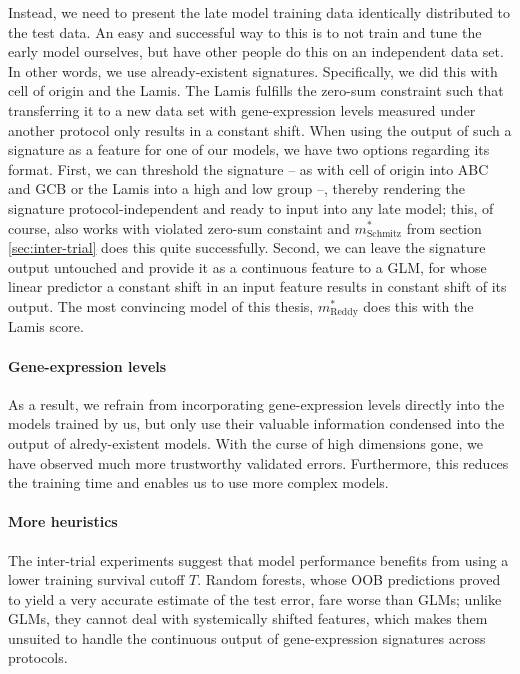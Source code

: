 Instead, we need to present the late model training data identically distributed to the test 
data. An easy and successful way to this is to not train and tune the early model ourselves, but have 
other people do this on an independent data set. In other words, we use already-existent signatures. 
Specifically, we did this with cell of origin and the Lamis. The Lamis fulfills the 
zero-sum constraint such that transferring it to a new data set with gene-expression levels 
measured under another protocol only results in a constant shift. When using the output of such 
a signature as a feature for one of our models, we have two options regarding its format.
First, we can threshold the signature -- as with cell of origin into ABC and GCB or the Lamis into 
a high and low group --, thereby rendering the signature protocol-independent and ready to input 
into any late model; this, of course, also works with violated zero-sum constaint and 
$m^*_\text{Schmitz}$ from section \ref{sec:inter-trial} 
does this quite successfully. Second, we can leave the signature output untouched and provide it as a 
continuous feature to a GLM, for whose linear predictor a constant shift in an input feature results 
in constant shift of its output. The most convincing model of this thesis, $m^*_\text{Reddy}$ does 
this with the Lamis score.

\paragraph{Gene-expression levels}
As a result, we refrain from incorporating gene-expression levels directly into the models trained 
by us, but only use their valuable information condensed into the output of alredy-existent models. 
With the curse of high dimensions gone, we have observed much more trustworthy validated errors. 
Furthermore, this reduces the training time and enables us to use more complex models.

\paragraph{More heuristics}

The inter-trial experiments suggest that model performance benefits from using a lower training 
survival cutoff $T$. Random forests, whose OOB predictions proved to yield a very accurate estimate 
of the test error, fare worse than GLMs; unlike GLMs, they cannot deal with systemically shifted 
features, which makes them unsuited to handle the continuous output of gene-expression signatures
across protocols.

